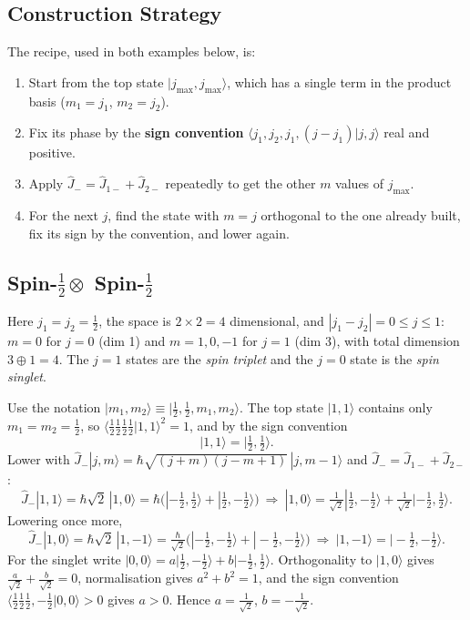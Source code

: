 \documentclass[11pt,a4paper]{article}
\begin{document}
\subsection{Construction Strategy}
The recipe, used in both examples below, is:
\begin{enumerate}[leftmargin=2em]
\item Start from the top state $|j_{\max},j_{\max}\rangle$, which has a single term in the product basis ($m_1=j_1$, $m_2=j_2$).
\item Fix its phase by the \textbf{sign convention} $\langle j_1,j_2,j_1,(j-j_1)|j,j\rangle$ real and positive.
\item Apply $\hat J_-=\hat J_{1-}+\hat J_{2-}$ repeatedly to get the other $m$ values of $j_{\max}$.
\item For the next $j$, find the state with $m=j$ orthogonal to the one already built, fix its sign by the convention, and lower again.
\end{enumerate}

\subsection{Spin-\texorpdfstring{$\tfrac12\otimes$}{1/2 x} Spin-\texorpdfstring{$\tfrac12$}{1/2}}
Here $j_1=j_2=\tfrac12$, the space is $2\times2=4$ dimensional, and $|j_1-j_2|=0\le j\le1$: $m=0$ for $j=0$ (dim 1) and $m=1,0,-1$ for $j=1$ (dim 3), with total dimension $3\oplus1=4$. The $j=1$ states are the \emph{spin triplet} and the $j=0$ state is the \emph{spin singlet}.

Use the notation $|m_1,m_2\rangle\equiv|\tfrac12,\tfrac12,m_1,m_2\rangle$. The top state $|1,1\rangle$ contains only $m_1=m_2=\tfrac12$, so $\langle\tfrac12\tfrac12\tfrac12\tfrac12|1,1\rangle^2=1$, and by the sign convention
\[
|1,1\rangle=|\tfrac12,\tfrac12\rangle .
\]
Lower with $\hat J_-|j,m\rangle=\hbar\sqrt{(j+m)(j-m+1)}\,|j,m-1\rangle$ and $\hat J_-=\hat J_{1-}+\hat J_{2-}$:
\[
\hat J_-|1,1\rangle=\hbar\sqrt2\,|1,0\rangle=\hbar\big(|-\tfrac12,\tfrac12\rangle+|\tfrac12,-\tfrac12\rangle\big)\ \Rightarrow\ |1,0\rangle=\tfrac1{\sqrt2}|\tfrac12,-\tfrac12\rangle+\tfrac1{\sqrt2}|-\tfrac12,\tfrac12\rangle .
\]
Lowering once more,
\[
\hat J_-|1,0\rangle=\hbar\sqrt2\,|1,-1\rangle=\tfrac\hbar{\sqrt2}\big(|-\tfrac12,-\tfrac12\rangle+|-\tfrac12,-\tfrac12\rangle\big)\ \Rightarrow\ |1,-1\rangle=|-\tfrac12,-\tfrac12\rangle .
\]
For the singlet write $|0,0\rangle=a|\tfrac12,-\tfrac12\rangle+b|-\tfrac12,\tfrac12\rangle$. Orthogonality to $|1,0\rangle$ gives $\tfrac a{\sqrt2}+\tfrac b{\sqrt2}=0$, normalisation gives $a^2+b^2=1$, and the sign convention $\langle\tfrac12\tfrac12\tfrac12,-\tfrac12|0,0\rangle>0$ gives $a>0$. Hence $a=\tfrac1{\sqrt2}$, $b=-\tfrac1{\sqrt2}$.
\end{document}
